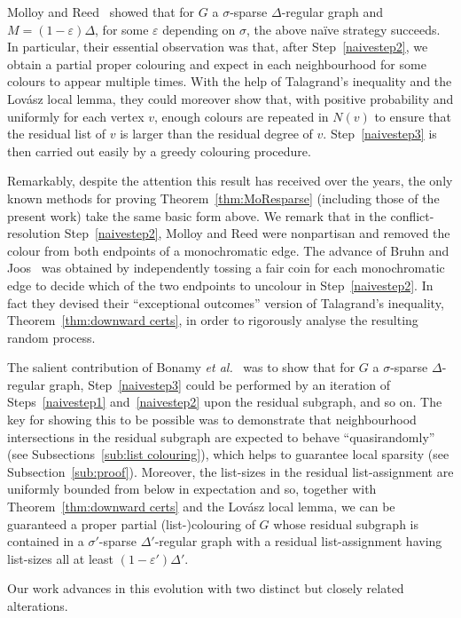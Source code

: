 \documentclass[11pt]{article}
\theoremstyle{plain}
\newcommand{\eps}{\varepsilon}
\begin{document}
Molloy and Reed~\cite{MoRe97} showed that for $G$ a $\sigma$-sparse $\Delta$-regular graph and $M=(1-\eps)\Delta$, for some $\eps$ depending on $\sigma$, the above na\"ive strategy succeeds. In particular, their essential observation was that, after Step~\ref{naivestep2}, we obtain a partial proper colouring and expect in each neighbourhood for some colours to appear multiple times.
With the help of Talagrand's inequality and the Lov\'asz local lemma, they could moreover show that, with positive probability and uniformly for each vertex $v$, enough colours are repeated in $N(v)$ to ensure that the residual list of $v$ is larger than the residual degree of $v$. Step~\ref{naivestep3} is then carried out easily by a greedy colouring procedure.

Remarkably, despite the attention this result has received over the years, the only known methods for proving Theorem~\ref{thm:MoResparse} (including those of the present work) take the same basic form above.
We remark that in the conflict-resolution Step~\ref{naivestep2}, Molloy and Reed were nonpartisan and removed the colour from both endpoints of a monochromatic edge. The advance of Bruhn and Joos~\cite{BrJo18} was obtained by independently tossing a fair coin for each monochromatic edge to decide which of the two endpoints to uncolour in Step~\ref{naivestep2}. In fact they devised their ``exceptional outcomes'' version of Talagrand's inequality, Theorem~\ref{thm:downward certs}, in order to rigorously analyse the resulting random process.

The salient contribution of Bonamy {\em et al.}~\cite{BPP18+} was to show that for $G$ a $\sigma$-sparse $\Delta$-regular graph, Step~\ref{naivestep3} could be performed by an iteration of Steps~\ref{naivestep1} and~\ref{naivestep2} upon the residual subgraph, and so on. The key for showing this to be possible was to demonstrate that neighbourhood intersections in the residual subgraph are expected to behave ``quasirandomly'' (see Subsections~\ref{sub:list colouring}), which helps to guarantee local sparsity (see Subsection~\ref{sub:proof}). Moreover, the list-sizes in the residual list-assignment are uniformly bounded from below in expectation and so, together with Theorem~\ref{thm:downward certs} and the Lov\'asz local lemma, we can be guaranteed a proper partial (list-)colouring of $G$ whose residual subgraph is contained in a $\sigma'$-sparse $\Delta'$-regular graph with a residual list-assignment having list-sizes all at least $(1-\eps')\Delta'$.

Our work advances in this evolution with two distinct but closely related alterations.
\end{document}
